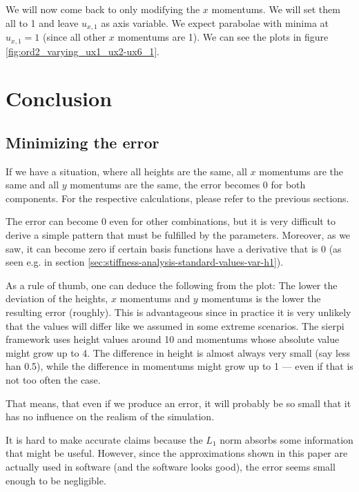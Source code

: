 \documentclass{article}
\begin{document}
We will now come back to only modifying the $x$ momentums. We will set them all to 1 and leave $u_{x,1}$ as axis variable. We expect parabolae with minima at $u_{x,1}=1$ (since all other $x$ momentums are 1). We can see the plots in figure \ref{fig:ord2_varying_ux1_ux2-ux6_1}.




\section{Conclusion}
\label{sec:stiffness-analysis-conclusion}

\subsection{Minimizing the error}
\label{sec:stiffness-analysis-concl-error-0}

If we have a situation, where all heights are the same, all $x$ momentums are the same and all $y$ momentums are the same, the error becomes 0 for both components. For the respective calculations, please refer to the previous sections.

The error can become 0 even for other combinations, but it is very difficult to derive a simple pattern that must be fulfilled by the parameters. Moreover, as we saw, it can become zero if certain basis functions have a derivative that is 0 (as seen e.g. in section \ref{sec:stiffness-analysis-standard-values-var-h1}).

As a rule of thumb, one can deduce the following from the plot: The lower the deviation of the heights, $x$ momentums and $y$ momentums is the lower the resulting error (roughly). This is advantageous since in practice it is very unlikely that the values will differ like we assumed in some extreme scenarios. The sierpi framework uses height values around 10 and momentums whose absolute value might grow up to 4. The difference in height is almost always very small (say less han 0.5), while the difference in momentums might grow up to 1 --- even if that is not too often the case.

That means, that even if we produce an error, it will probably be so small that it has no influence on the realism of the simulation.

It is hard to make accurate claims because the $L_1$ norm absorbs some information that might be useful. However, since the approximations shown in this paper are actually used in software (and the software looks good), the error seems small enough to be negligible.
\end{document}
